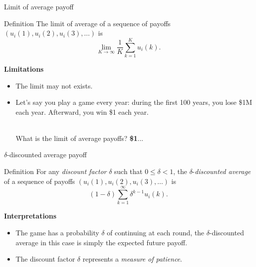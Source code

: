 \begin{frame}{Limit of average payoff}
    \begin{block}{Definition}
        The limit of average of a sequence of payoffs $(u_i(1), u_i(2), u_i(3), \dots)$ is
        \[ \lim_{K\to\infty} \frac{1}{K} \sum_{k=1}^K u_i(k). \]
    \end{block}
    
    \textbf{{\color{orange}Limitations}}\\
    \pause
    \begin{itemize}
        \item The limit may not exists. \pause
        \item Let's say you play a game every year: during the first 100 years, you lose \$1M
        each year. Afterward, you win \$1 each year.\\\
            
        What is the limit of average payoffs? \pause \textbf{{\color{orange}\$1}}...
    \end{itemize}
\end{frame}


\begin{frame}{$\delta$-discounted average payoff}
    \begin{block}{Definition}
        For any \textit{discount factor} $\delta$ such that $0 \le \delta < 1$, the $\delta$-\textit{discounted
        average} of a sequence of payoffs $(u_i(1), u_i(2), u_i(3), \dots)$ is
        \[ (1-\delta)\sum_{k=1}^{\infty} \delta^{k-1}u_i(k). \]
    \end{block}

    \textbf{{\color{green}Interpretations}}\\
    \pause
    \begin{itemize}
        \item The game has a probability $\delta$ of continuing at each round, the $\delta$-discounted
        average in this case is simply the expected future payoff. \pause
        \item The discount factor $\delta$ represents a \textit{measure of patience}.
    \end{itemize}
\end{frame}

